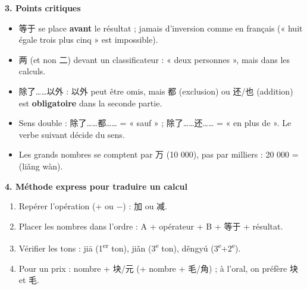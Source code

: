 \documentclass[11pt]{article}
\newcommand{\cle}[1]{{\popxbold\color{popdark}#1}}
\newcommand{\zh}[1]{\ifmmode\text{#1}\else{#1}\fi}
\begin{document}
\begin{bilan}
\textbf{3. Points critiques}
\begin{itemize}
\item \cle{等于} se place \textbf{avant} le résultat ; jamais d'inversion comme en français (« huit égale trois plus cinq » est impossible).
\item \cle{两} (et non 二) devant un classificateur : \zh{两个人} « deux personnes », mais \zh{二加二} dans les calculs.
\item \cle{除了……以外} : 以外 peut être omis, mais \cle{都} (exclusion) ou \cle{还/也} (addition) est \textbf{obligatoire} dans la seconde partie.
\item Sens double : 除了……都…… = « sauf » ; 除了……还…… = « en plus de ». Le verbe suivant décide du sens.
\item Les grands nombres se comptent par \cle{万} (10 000), pas par milliers : 20 000 = \zh{两万} (liǎng wàn).
\end{itemize}

\textbf{4. Méthode express pour traduire un calcul}
\begin{enumerate}
\item Repérer l'opération (+ ou −) : 加 ou 减.
\item Placer les nombres dans l'ordre : A + opérateur + B + 等于 + résultat.
\item Vérifier les tons : jiā (1\textsuperscript{er} ton), jiǎn (3\textsuperscript{e} ton), děngyú (3\textsuperscript{e}+2\textsuperscript{e}).
\item Pour un prix : nombre + 块/元 (+ nombre + 毛/角) ; à l'oral, on préfère 块 et 毛.
\end{enumerate}
\end{bilan}
\end{document}
